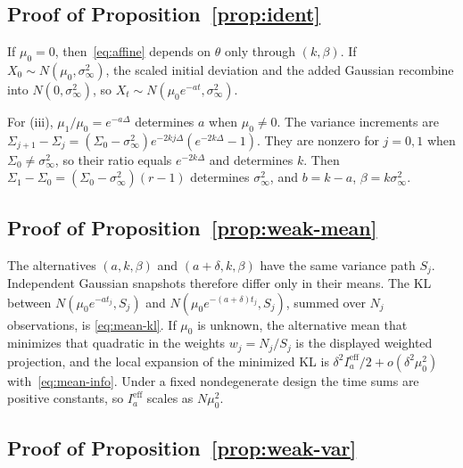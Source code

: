 \documentclass[anon,11pt]{alt2027}
\providecommand{\qed}{\hfill\BlackBox}
\begin{document}
\subsection{Proof of Proposition~\ref{prop:ident}}

If $\mu_0=0$, then~\eqref{eq:affine} depends on $\theta$ only through $(k,\beta)$.
If $X_0\sim N(\mu_0,\sigma_\infty^2)$, the scaled initial deviation and the
added Gaussian recombine into $N(0,\sigma_\infty^2)$, so
$X_t\sim N(\mu_0 e^{-at},\sigma_\infty^2)$.

For (iii), $\mu_1/\mu_0=e^{-a\Delta}$ determines $a$ when $\mu_0\neq 0$. The
variance increments are
$\Sigma_{j+1}-\Sigma_j=(\Sigma_0-\sigma_\infty^2)e^{-2kj\Delta}(e^{-2k\Delta}-1)$.
They are nonzero for $j=0,1$ when $\Sigma_0\neq\sigma_\infty^2$, so their ratio
equals $e^{-2k\Delta}$ and determines $k$. Then
$\Sigma_1-\Sigma_0=(\Sigma_0-\sigma_\infty^2)(r-1)$ determines
$\sigma_\infty^2$, and $b=k-a$, $\beta=k\sigma_\infty^2$.\qed

\subsection{Proof of Proposition~\ref{prop:weak-mean}}

The alternatives $(a,k,\beta)$ and $(a+\delta,k,\beta)$ have the same variance
path $S_j$. Independent Gaussian snapshots therefore differ only in their
means. The KL between $N(\mu_0 e^{-at_j},S_j)$ and
$N(\mu_0 e^{-(a+\delta)t_j},S_j)$, summed over $N_j$ observations, is
\eqref{eq:mean-kl}. If $\mu_0$ is unknown, the alternative mean that minimizes
that quadratic in the weights $w_j=N_j/S_j$ is the displayed weighted
projection, and the local expansion of the minimized KL is
$\delta^2 I_a^{\mathrm{eff}}/2+o(\delta^2\mu_0^2)$ with~\eqref{eq:mean-info}. Under
a fixed nondegenerate design the time sums are positive constants, so
$I_a^{\mathrm{eff}}$ scales as $N\mu_0^2$.\qed

\subsection{Proof of Proposition~\ref{prop:weak-var}}
\end{document}
